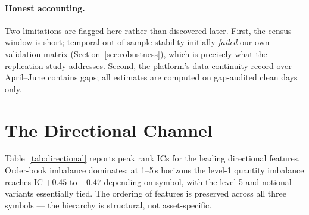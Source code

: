 \documentclass[11pt,a4paper]{article}
\theoremstyle{definition}
\theoremstyle{plain}
\begin{document}
\paragraph{Honest accounting.} Two limitations are flagged here rather
than discovered later. First, the census window is short; temporal
out-of-sample stability initially \emph{failed} our own validation
matrix (Section~\ref{sec:robustness}), which is precisely what the
replication study addresses. Second, the platform's data-continuity
record over April--June contains gaps; all estimates are computed on
gap-audited clean days only.

\section{The Directional Channel}\label{sec:directional}

Table~\ref{tab:directional} reports peak rank ICs for the leading
directional features. Order-book imbalance dominates: at 1--5\,s
horizons the level-1 quantity imbalance reaches IC $+0.45$ to $+0.47$
depending on symbol, with the level-5 and notional variants
essentially tied. The ordering of features is preserved across all
three symbols --- the hierarchy is structural, not asset-specific.
\end{document}
